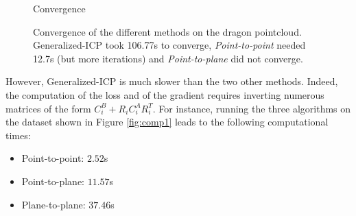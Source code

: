 \documentclass[11pt,letterpaper,leqno]{article}
\begin{document}
\begin{figure}[ht!]
\begin{minipage}{0.5\linewidth}
    \caption{Convergence}
    \end{minipage}
    \caption{Convergence of the different methods on the dragon pointcloud. Generalized-ICP took 106.77s to converge, \textit{Point-to-point} needed 12.7s (but more iterations) and \textit{Point-to-plane} did not converge.}
    \label{fig:comp_dragon}
\end{figure}


However, Generalized-ICP is much slower than the two other methods. Indeed, the computation of the loss and of the gradient requires inverting numerous matrices of the form $C_i^B + R_i C_i^A R_i^T$. For instance, running the three algorithms on the dataset shown in Figure \ref{fig:comp1} leads to the following computational times:
\begin{itemize}
    \item Point-to-point: $2.52$s
    \item Point-to-plane: $11.57$s
    \item Plane-to-plane: $37.46$s
\end{itemize}
\end{document}
